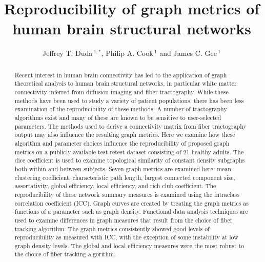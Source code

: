 \documentclass{frontiersSCNS} %
\def\journal{Neurosciences}
\def\firstAuthorLast{Duda {et~al}} %
\def\Authors{Jeffrey T. Duda\,$^{1,*}$, Philip A. Cook\,$^{1}$ and James C. Gee\,$^1$}
\begin{document}
\onecolumn
{}

\title[Reproducibility of structural graph metrics]{Reproducibility of graph metrics of human brain structural networks}
\author[\firstAuthorLast ]{\Authors}
\address{}
\correspondance{}
\editor{}

\maketitle
\begin{abstract}

Recent interest in human brain connectivity has led to the application of
graph theoretical analysis to human brain structural networks, in
particular white matter connectivity inferred from diffusion imaging
and fiber tractography. While these methods have been used to study a
variety of patient populations, there has been less examination of the
reproducibility of these methods. A number of tractography algorithms
exist and many of these are known to be sensitive to user-selected
parameters. The methods used to derive a connectivity matrix from
fiber tractography output may also influence the resulting graph
metrics. Here we examine how these algorithm and parameter choices
influence the reproducibility of proposed graph metrics on a publicly
available test-retest dataset consisting of 21 healthy adults. 
The dice coefficient is used to examine topological similarity
of constant density subgraphs both within and between subjects.
Seven graph metrics are examined here: mean clustering coefficient, 
characteristic path length, largest connected component size, assortativity,
global efficiency, local efficiency, and rich club coefficient. The reproducibility of
these network summary
measures is examined using the intraclass correlation coefficient
(ICC). Graph curves are created by treating the
graph metrics as functions of a parameter such as graph density.
 Functional data analysis techniques are used
to examine differences in graph measures that result from the choice
of fiber tracking algorithm. The graph metrics consistently showed
good levels of reproducibility as measured with ICC, with the exception of some instability at
low graph density levels. The global and local efficiency measures were 
the most robust to the choice of fiber tracking algorithm.


\end{abstract}
\end{document}
